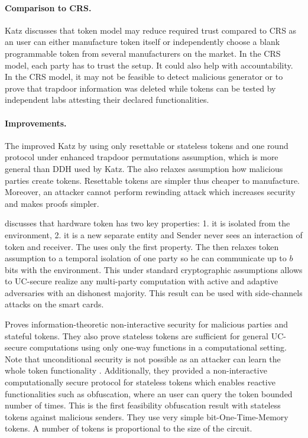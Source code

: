 \documentclass[
  digital, %
  twoside, %
  table,   %
  lof,     %
  lot,     %
]{fithesis3}
\newcommand{\cmmnt}[1]{\ignorespaces}
\theoremstyle{definition}
\theoremstyle{remark}
\begin{document}
\paragraph{Comparison to CRS.} %
Katz discusses that token model may reduce required trust compared to CRS as an user can either manufacture token itself or independently choose a blank programmable token from several manufacturers on the market. In the CRS model, each party has to trust the setup.
It could also help with accountability. In the CRS model, it may not be feasible to detect malicious generator or to prove that trapdoor information was deleted while tokens can be tested by independent labs attesting their declared functionalities.

\paragraph{Improvements.}%
The \cite{CGS08} improved Katz by using only resettable or stateless tokens and one round protocol under enhanced trapdoor permutations assumption, which is more general than DDH used by Katz. The \cite{CGS08} also relaxes assumption how malicious parties create tokens\cmmnt{Attacker does not need to know the code}. Resettable tokens are simpler thus cheaper to manufacture. Moreover, an attacker cannot perform rewinding attack which increases security and makes proofs simpler.

\cite{DNW09} discusses that hardware token has two key properties: 1. it is isolated from the environment, 2. it is a new separate entity and Sender never sees an interaction of token and receiver. The \cite{K07} uses only the first property. The \cite{DNW09} then relaxes token assumption to a temporal isolation of one party so he can communicate up to $b$ bits with the environment. This under standard cryptographic assumptions allows to UC-secure realize any multi-party computation with active and adaptive adversaries with an dishonest majority. This result can be used with side-channels attacks on the smart cards.

\cite{GISVW10} Proves information-theoretic non-interactive security for malicious parties and stateful tokens. They also prove stateless tokens are sufficient for general UC-secure computations using only one-way functions in a computational setting. Note that unconditional security is not possible as an attacker can learn the whole token functionality \cite{GIMS10}. Additionally, they provided a non-interactive computationally secure protocol for stateless tokens which enables reactive functionalities such as obfuscation, where an user can query the token bounded number of times. This is the first feasibility obfuscation result with stateless tokens against malicious senders. They use very simple bit-One-Time-Memory tokens. A number of tokens is proportional to the size of the circuit.
\end{document}
